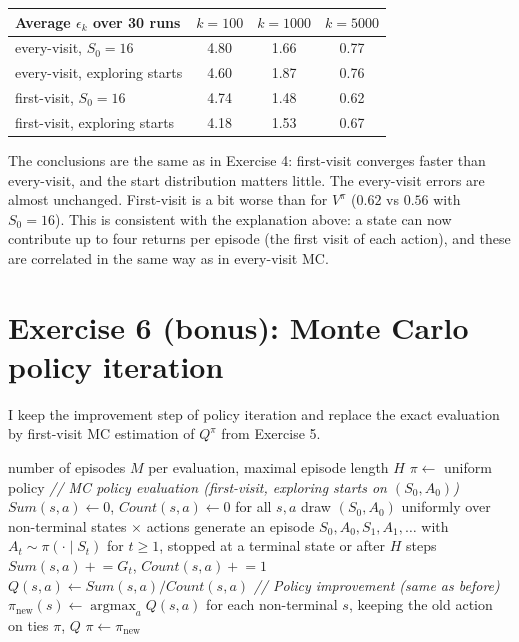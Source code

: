 \documentclass[letterpaper, 11pt]{article}
\newcommand{\1}{\mathds{1}}	%
\DeclareMathOperator*{\argmax}{argmax}    %
\theoremstyle{definition}
\begin{document}
\begin{center}
\begin{tabular}{lccc}
\toprule
Average $\epsilon_k$ over 30 runs & $k = 100$ & $k = 1000$ & $k = 5000$ \\
\midrule
every-visit, $S_0 = 16$        & 4.80 & 1.66 & 0.77 \\
every-visit, exploring starts  & 4.60 & 1.87 & 0.76 \\
first-visit, $S_0 = 16$        & 4.74 & 1.48 & 0.62 \\
first-visit, exploring starts  & 4.18 & 1.53 & 0.67 \\
\bottomrule
\end{tabular}
\end{center}

The conclusions are the same as in Exercise 4: first-visit converges faster than every-visit, and the start distribution matters little. The every-visit errors are almost unchanged. First-visit is a bit worse than for $V^\pi$ ($0.62$ vs $0.56$ with $S_0 = 16$). This is consistent with the explanation above: a state can now contribute up to four returns per episode (the first visit of each action), and these are correlated in the same way as in every-visit MC.

\section*{Exercise 6 (bonus): Monte Carlo policy iteration}

I keep the improvement step of policy iteration and replace the exact evaluation by first-visit MC estimation of $Q^\pi$ from Exercise 5.

\begin{algorithm}[H]
\caption{Monte Carlo policy iteration}
\begin{algorithmic}[1]
\Require number of episodes $M$ per evaluation, maximal episode length $H$
\State $\pi \gets$ uniform policy
\Loop
  \State \textit{// MC policy evaluation (first-visit, exploring starts on $(S_0, A_0)$)}
  \State $\textit{Sum}(s, a) \gets 0$, $\textit{Count}(s, a) \gets 0$ for all $s, a$
    \State draw $(S_0, A_0)$ uniformly over non-terminal states $\times$ actions
    \State generate an episode $S_0, A_0, S_1, A_1, \dots$ with $A_t \sim \pi(\cdot \mid S_t)$ for $t \ge 1$, stopped at a terminal state or after $H$ steps
      \State $\textit{Sum}(s, a) \mathrel{+}= G_t$, $\textit{Count}(s, a) \mathrel{+}= 1$
    \EndFor
  \EndFor
  \State $Q(s, a) \gets \textit{Sum}(s, a) / \textit{Count}(s, a)$
  \State \textit{// Policy improvement (same as before)}
  \State $\pi_{\text{new}}(s) \gets \argmax_a Q(s, a)$ for each non-terminal $s$, keeping the old action on ties
   \Return $\pi$, $Q$ \EndIf
  \State $\pi \gets \pi_{\text{new}}$
\EndLoop
\end{algorithmic}
\end{algorithm}
\end{document}

